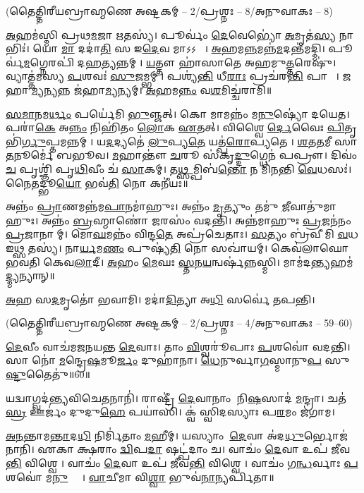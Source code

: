 \centerline{\normalsize (𑌤𑍈𑌤𑍍𑌤𑌿𑌰𑍀𑌯𑌬𑍍𑌰𑌾𑌹𑍍𑌮𑌣𑍇 𑌅𑌷𑍍𑌟𑌕𑌮𑍍 – 2/𑌪𑍍𑌰𑌶𑍍𑌨𑌃 – 8/𑌅𑌨𑍁𑌵𑌾𑌕𑌃 – 8)}
\ul{𑌅}𑌹𑌮॑𑌸𑍍𑌮𑌿 𑌪𑍍𑌰𑌥\ul{𑌮}𑌜𑌾 \ul{𑌋}𑌤𑌸𑍍𑌯॑।
𑌪𑍂𑌰𑍍𑌵𑌂॑ \ul{𑌦𑍇}𑌵𑍇𑌭𑍍𑌯𑍋॑ \ul{𑌅}𑌮𑍃𑌤॑\ul{𑌸𑍍𑌯} 𑌨𑌾𑌭𑌿𑌃॑।
𑌯𑍋 \ul{𑌮𑌾} 𑌦𑌦𑌾॑\ul{𑌤𑌿} 𑌸 𑌇\ul{𑌦𑍇}𑌵 𑌮𑌾𑌽𑌽𑌵𑌾𑌃᳚।
\ul{𑌅}𑌹𑌮\ul{𑌨𑍍𑌨}𑌮𑌨𑍍𑌨॑\ul{𑌮}𑌦𑌨𑍍𑌤॑𑌮𑌦𑍍𑌮𑌿।
𑌪𑍂𑌰𑍍𑌵॑\ul{𑌮}𑌗𑍍𑌨𑍇𑌰𑌪𑌿॑ 𑌦\ul{𑌹}𑌤𑍍𑌯𑌨𑍍𑌨𑌮𑍍।
\ul{𑌯}𑌤𑍍𑌤𑍗 𑌹𑌾॑𑌸𑌾𑌤𑍇 𑌅𑌹𑌮𑍁\ul{𑌤𑍍𑌤}𑌰𑍇𑌷𑍁॑।
𑌵𑍍𑌯𑌾𑌤𑍍𑌤॑𑌮𑌸𑍍𑌯 \ul{𑌪}𑌶𑌵𑌃॑ \ul{𑌸𑍁}𑌜𑌮𑍍𑌭𑌮𑍍।
𑌪𑌶𑍍𑌯॑\ul{𑌨𑍍𑌤𑌿} 𑌧𑍀\ul{𑌰𑌾𑌃} 𑌪𑍍𑌰𑌚॑𑌰\ul{𑌨𑍍𑌤𑌿} 𑌪𑌾𑌕𑌾𑌃᳚।
𑌜𑌹𑌾\ul{𑌮𑍍𑌯}𑌨𑍍𑌯𑌨𑍍𑌨 𑌜॑𑌹𑌾\ul{𑌮𑍍𑌯}𑌨𑍍𑌯𑌮𑍍।
\ul{𑌅}𑌹𑌮\ul{𑌨𑍍𑌨𑌂} 𑌵\ul{𑌶}𑌮𑌿𑌚𑍍𑌚॑𑌰𑌾𑌮𑌿॥

\ul{𑌸}\ul{𑌮𑌾}𑌨𑌮\ul{𑌰𑍍𑌥𑌂} 𑌪𑌰𑍍𑌯𑍇॑𑌮𑌿 \ul{𑌭𑍁}𑌞𑍍𑌜𑌤𑍍।
𑌕𑍋 𑌮𑌾𑌮𑌨𑍍𑌨𑌂॑ 𑌮\ul{𑌨𑍁}𑌷𑍍𑌯𑍋॑ 𑌦𑌯𑍇𑌤।
𑌪𑌰𑌾॑\ul{𑌕𑍇} 𑌅\ul{𑌨𑍍𑌨𑌂} 𑌨𑌿𑌹𑌿॑𑌤𑌂 \ul{𑌲𑍋}𑌕 \ul{𑌏}𑌤𑌤𑍍।
𑌵𑌿𑌶𑍍𑌵𑍈\ul{𑌰𑍍𑌦𑍇}𑌵𑍈𑌃 \ul{𑌪𑌿}𑌤𑍃𑌭𑌿॑\ul{𑌰𑍍𑌗𑍁}𑌪𑍍𑌤𑌮𑌨𑍍𑌨𑌮𑍍।
𑌯\ul{𑌦}𑌦𑍍𑌯𑌤𑍇॑ \ul{𑌲𑍁}𑌪𑍍𑌯\ul{𑌤𑍇} 𑌯𑌤𑍍𑌪॑\ul{𑌰𑍋}𑌪𑍍𑌯𑌤𑍇।
\ul{𑌶}\ul{𑌤}\ul{𑌤}𑌮𑍀 𑌸𑌾 \ul{𑌤}𑌨𑍂𑌰𑍍𑌮𑍇॑ 𑌬𑌭𑍂𑌵।
\ul{𑌮}𑌹𑌾𑌨𑍍𑌤𑍗॑ \ul{𑌚}𑌰𑍂 𑌸॑𑌕𑍃\ul{𑌦𑍍𑌦𑍁}𑌗𑍍𑌧𑍇𑌨॑ 𑌪𑌪𑍍𑌰𑍗।
𑌦𑌿𑌵𑌂॑ \ul{𑌚} 𑌪𑍃𑌶𑍍𑌞𑌿॑ 𑌪𑍃\ul{𑌥𑌿}𑌵𑍀𑌂 𑌚॑ \ul{𑌸𑌾}𑌕𑌮𑍍।
𑌤\ul{𑌥𑍍𑌸}𑌮𑍍𑌪𑌿𑌬॑\ul{𑌨𑍍𑌤𑍋} 𑌨 𑌮𑌿॑𑌨𑌨𑍍𑌤𑌿 \ul{𑌵𑍇}𑌧𑌸𑌃॑।
𑌨𑍈𑌤𑌦𑍍𑌭𑍂\ul{𑌯𑍋} 𑌭𑌵॑\ul{𑌤𑌿} 𑌨𑍋 𑌕𑌨𑍀॑𑌯𑌃॥

𑌅𑌨𑍍𑌨𑌂॑ \ul{𑌪𑍍𑌰𑌾}𑌣𑌮𑌨𑍍𑌨॑𑌮\ul{𑌪𑌾}𑌨𑌮𑌾॑𑌹𑍁𑌃।
𑌅𑌨𑍍𑌨𑌂॑ \ul{𑌮𑍃}𑌤𑍍𑌯𑍁𑌂 𑌤𑌮𑍁॑ \ul{𑌜𑍀}𑌵𑌾𑌤𑍁॑𑌮𑌾𑌹𑍁𑌃।
𑌅𑌨𑍍𑌨𑌂॑ \ul{𑌬𑍍𑌰}𑌹𑍍𑌮𑌾𑌣𑍋॑ \ul{𑌜}𑌰𑌸𑌂॑  𑌵𑌦𑌨𑍍𑌤𑌿।
𑌅𑌨𑍍𑌨॑𑌮𑌾𑌹𑍁𑌃 \ul{𑌪𑍍𑌰}𑌜𑌨॑𑌨𑌂 \ul{𑌪𑍍𑌰}𑌜𑌾𑌨𑌾𑌮𑍍।
𑌮𑍋\ul{𑌘}𑌮𑌨𑍍𑌨𑌂॑ 𑌵𑌿𑌨𑍍𑌦\ul{𑌤𑍇} 𑌅𑌪𑍍𑌰॑𑌚𑍇𑌤𑌾𑌃।
\ul{𑌸}𑌤𑍍𑌯𑌂 𑌬𑍍𑌰॑𑌵𑍀𑌮𑌿 \ul{𑌵}𑌧 𑌇𑌥𑍍𑌸 𑌤𑌸𑍍𑌯॑।
𑌨𑌾\ul{𑌰𑍍𑌯}𑌮\ul{𑌣𑌂} 𑌪𑍁𑌷𑍍𑌯॑\ul{𑌤𑌿} 𑌨𑍋 𑌸𑌖𑌾॑𑌯𑌮𑍍।
𑌕𑍇𑌵॑𑌲𑌾𑌘𑍋 𑌭𑌵𑌤𑌿 𑌕𑍇𑌵\ul{𑌲𑌾}𑌦𑍀।
\ul{𑌅}𑌹𑌂 \ul{𑌮𑍇}𑌘𑌃 \ul{𑌸𑍍𑌤}𑌨\ul{𑌯}𑌨𑍍𑌵𑌰𑍍\mbox{}𑌷॑𑌨𑍍𑌨𑌸𑍍𑌮𑌿।
𑌮𑌾𑌮॑𑌦\ul{𑌨𑍍𑌤𑍍𑌯}𑌹𑌮॑\ul{𑌦𑍍𑌮𑍍𑌯}𑌨𑍍𑌯𑌾𑌨𑍍॥

\ul{𑌅}𑌹 𑌸\ul{𑌦}𑌮𑍃𑌤𑍋॑ 𑌭𑌵𑌾𑌮𑌿।
𑌮𑌦𑌾॑\ul{𑌦𑌿}𑌤𑍍𑌯𑌾 𑌅\ul{𑌧𑌿} 𑌸𑌰𑍍𑌵𑍇॑ 𑌤𑌪𑌨𑍍𑌤𑌿।

\centerline{\normalsize (𑌤𑍈𑌤𑍍𑌤𑌿𑌰𑍀𑌯𑌬𑍍𑌰𑌾𑌹𑍍𑌮𑌣𑍇 𑌅𑌷𑍍𑌟𑌕𑌮𑍍 – 2/𑌪𑍍𑌰𑌶𑍍𑌨𑌃 – 4/𑌅𑌨𑍁𑌵𑌾𑌕𑌃 – 59–60)}

\ul{𑌦𑍇}𑌵𑍀𑌂 𑌵𑌾𑌚॑𑌮𑌜𑌨𑌯𑌨𑍍𑌤 \ul{𑌦𑍇}𑌵𑌾𑌃।
𑌤𑌾𑌂 \ul{𑌵𑌿}𑌶𑍍𑌵𑌰𑍂॑𑌪𑌾𑌃 \ul{𑌪}𑌶𑌵𑍋॑ 𑌵𑌦𑌨𑍍𑌤𑌿।
𑌸𑌾 𑌨𑍋॑ \ul{𑌮}𑌨𑍍𑌦𑍍𑌰𑍇\ul{𑌷}𑌮𑍂\ul{𑌰𑍍𑌜𑌂} 𑌦𑍁𑌹𑌾॑𑌨𑌾।
\ul{𑌧𑍇}𑌨𑍁𑌰𑍍𑌵𑌾\ul{𑌗}𑌸𑍍𑌮𑌾𑌨𑍁\ul{𑌪} 𑌸𑍁\ul{𑌷𑍍𑌟𑍁}𑌤𑍈𑌤𑍁॑॥60॥


𑌯𑌦𑍍𑌵𑌾𑌗𑍍𑌵𑌦॑𑌨𑍍𑌤𑍍𑌯𑌵𑌿𑌚𑍇\ul{𑌤}𑌨𑌾𑌨𑌿॑।
𑌰𑌾𑌷𑍍𑌟𑍍𑌰𑍀॑ \ul{𑌦𑍇}𑌵𑌾𑌨𑌾𑌂 𑌨𑌿\ul{𑌷}𑌸𑌾𑌦॑ \ul{𑌮}𑌨𑍍𑌦𑍍𑌰𑌾।
𑌚𑌤॑\ul{𑌸𑍍𑌰} 𑌊𑌰𑍍𑌜𑌂॑ 𑌦𑍁𑌦𑍁\ul{𑌹𑍇} 𑌪𑌯𑌾॑𑌸𑌿।
𑌕𑍍𑌵॑ 𑌸𑍍𑌵𑌿𑌦𑌸𑍍𑌯𑌾𑌃 𑌪\ul{𑌰}𑌮𑌂 𑌜॑𑌗𑌾𑌮।

\closesection

\ul{𑌅}\ul{𑌨}𑌨𑍍𑌤𑌾𑌮\ul{𑌨𑍍𑌤𑌾}𑌦\ul{𑌧𑌿} 𑌨𑌿𑌰𑍍𑌮𑌿॑𑌤𑌾𑌂 \ul{𑌮}𑌹𑍀𑌮𑍍।
𑌯𑌸𑍍𑌯𑌾𑌂 \ul{𑌦𑍇}𑌵𑌾 𑌅॑𑌦\ul{𑌧𑍁}𑌰𑍍𑌭𑍋𑌜॑𑌨𑌾𑌨𑌿।
𑌏𑌕𑌾𑌕𑍍𑌷𑌰𑌾𑌂 \ul{𑌦𑍍𑌵𑌿}𑌪\ul{𑌦𑌾}\ul{} 𑌷𑌟𑍍𑌪॑𑌦𑌾𑌂 𑌚।
𑌵𑌾𑌚𑌂॑ \ul{𑌦𑍇}𑌵𑌾 𑌉𑌪॑ 𑌜𑍀𑌵\ul{𑌨𑍍𑌤𑌿} 𑌵𑌿𑌶𑍍𑌵𑍇।
𑌵𑌾𑌚𑌂॑ \ul{𑌦𑍇}𑌵𑌾 𑌉𑌪॑ 𑌜𑍀𑌵\ul{𑌨𑍍𑌤𑌿} 𑌵𑌿𑌶𑍍𑌵𑍇।
𑌵𑌾𑌚𑌂॑ 𑌗\ul{𑌨𑍍𑌧}𑌰𑍍𑌵𑌾𑌃 \ul{𑌪}𑌶𑌵𑍋॑ 𑌮\ul{𑌨𑍁}𑌷𑍍𑌯𑌾𑌃᳚।
\ul{𑌵𑌾}𑌚𑍀𑌮𑌾 𑌵𑌿\ul{𑌶𑍍𑌵𑌾} 𑌭𑍁𑌵॑\ul{𑌨𑌾}𑌨𑍍𑌯𑌰𑍍𑌪𑌿॑𑌤𑌾॥

